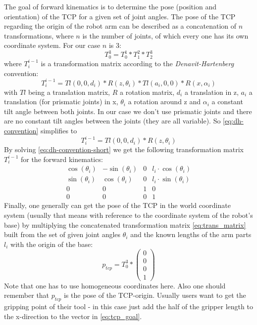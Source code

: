 \documentclass[conference]{IEEEtran}
\begin{document}
\par
The goal of forward kinematics is to determine the pose (position and orientation) of the TCP for a given set of joint angles. The pose of the TCP regarding the origin of the robot arm can be described as a concatenation of $n$ transformations, where $n$ is the number of joints, of which every one has its own coordinate system. For our case $n$ is 3:
\begin{equation}\label{eq:trans_matrix}
T_0^3 = T_0^1 * T_1^2 * T_2^3
\end{equation}
where $T_i^{i-1}$ is a transformation matrix according to the \textit{Denavit-Hartenberg} convention:
\begin{equation}\label{eq:dh-convention}
T_i^{i-1} = Tl(0,0,d_i) * R(z, \theta_i) * Tl(a_i,0,0) * R(x, \alpha_i)
\end{equation}
with $Tl$ being a translation matrix, $R$ a rotation matrix, $d_i$ a translation in z, $a_i$ a translation (for prismatic joints) in x, $\theta_i$ a rotation around z and $\alpha_i$ a constant tilt angle between both joints. In our case we don't use prismatic joints and there are no constant tilt angles between the joints (they are all variable). So \autoref{eq:dh-convention} simplifies to 
\begin{equation}\label{eq:dh-convention-short}
T_i^{i-1} = Tl(0,0,d_i) * R(z, \theta_i)
\end{equation}
By solving \autoref{eq:dh-convention-short} we get the following transformation matrix $T_i^{i-1}$ for the forward kinematics:
\[
\begin{matrix}
\cos(\theta_i) & -\sin(\theta_i) & 0 & l_i \cdot \cos(\theta_i)  \\
\sin(\theta_i) & \cos(\theta_i) & 0 & l_i \cdot \sin(\theta_i) \\
0 & 0 & 1 & 0 \\
0 & 0 & 0 & 1
\end{matrix}
\]
Finally, one generally can get the pose of the TCP in the world coordinate system (usually that means with reference to the coordinate system of the robot's base) by multiplying the concatenated transformation matrix \ref{eq:trans_matrix} built from the set of given joint angles $\theta_i$ and the known lengths of the arm parts $l_i$ with the origin of the base:
\begin{equation}\label{eq:tcp_goal}
p_{tcp} = T_0^3 * \begin{pmatrix}0\\0\\0\\1\end{pmatrix}
\end{equation}
Note that one has to use homogeneous coordinates here. Also one should remember that $p_{tcp}$ is the pose of the TCP-origin. Usually users want to get the gripping point of their tool - in this case just add the half of the gripper length to the x-direction to the vector in \autoref{eq:tcp_goal}.
\\
\par
\end{document}
